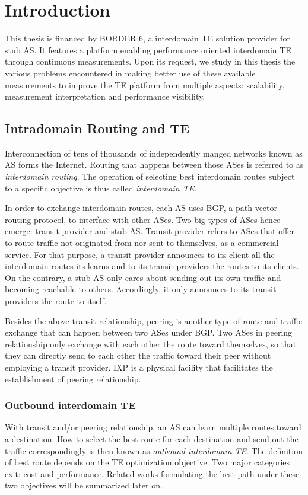 \chapter{Introduction}
\label{sec:intro}

This thesis is financed by BORDER 6, a interdomain \acf{TE} solution provider for stub \acf{AS}. 
It features a platform enabling performance oriented interdomain TE through continuous measurements.
Upon its request, we study in this thesis the various problems encountered in making better use of these available measurements to improve the TE platform from multiple aspects: scalability, measurement interpretation and performance visibility.

\section{Intradomain Routing and TE}
Interconnection of tens of thousands of independently manged networks known as \acf{AS} forms the Internet.
Routing that happens between those ASes is referred to as \textit{interdomain routing}.
The operation of selecting best interdomain routes subject to a specific objective is thus called \textit{interdomain \acf{TE}}.

In order to exchange interdomain routes, each AS uses \acf{BGP}, a path vector routing protocol, to interface with other ASes.  
Two big types of ASes hence emerge: transit provider and stub AS.
Transit provider refers to ASes that offer to route traffic not originated from nor sent to themselves, as a commercial service.
For that purpose, a transit provider announces to its client all the interdomain routes its learns and to its transit providers the routes to its clients.
On the contrary, a stub AS only cares about sending out its own traffic and becoming reachable to others.
Accordingly, it only announces to its transit providers the route to itself.

Besides the above transit relationship, peering is another type of route and traffic exchange that can happen between two ASes under BGP. Two ASes in peering relationship only exchange with each other the route toward themselves, so that they can directly send to each other the traffic toward their peer without employing a transit provider.
\acf{IXP} is a physical facility that facilitates the establishment of peering relationship.

\subsection{Outbound interdomain TE}
With transit and/or peering relationship, an AS can learn multiple routes toward a destination. How to select the best route for each destination and send out the traffic correspondingly is then known as \textit{outbound interdomain TE}. The definition of best route depends on the TE optimization objective. Two major categories exit: cost and performance. Related works formulating the best path under these two objectives will be summarized later on.

